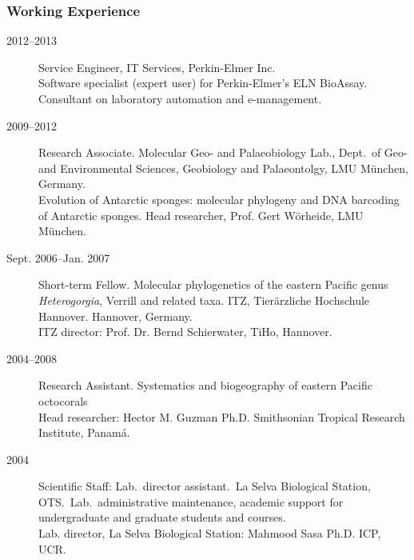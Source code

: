 \documentclass[letter,10pt]{article}
\begin{document}
\subsubsection*{Working Experience}
\begin{description}
\item [2012--2013] Service Engineer, IT Services, Perkin-Elmer Inc.\\Software specialist (expert user) for Perkin-Elmer's ELN BioAssay. Consultant on laboratory automation and e-management.

\item[2009--2012] Research Associate. Molecular Geo- and Palaeobiology Lab., Dept.~of Geo- and Environmental Sciences, Geobiology and Palaeontolgy, LMU M\"unchen, Germany.\\ Evolution of Antarctic sponges: molecular phylogeny and DNA barcoding of Antarctic sponges.
Head researcher, Prof. Gert W\"orheide, LMU M\"unchen.

\item[Sept. 2006--Jan. 2007] Short-term Fellow. Molecular phylogenetics of the eastern Pacific genus \emph{Heterogorgia}, Verrill and related taxa. ITZ, Tier\"arzliche Hochschule Hannover. Hannover, Germany.\\
ITZ director: Prof. Dr. Bernd Schierwater, TiHo, Hannover.

\item[2004--2008] Research Assistant. Systematics and biogeography of eastern Pacific octocorals\\
Head researcher: Hector M. Guzman Ph.D. Smithsonian Tropical Research Institute, Panam\'a.

\item[2004] Scientific Staff: Lab.~director assistant.~La Selva Biological Station, OTS.~Lab.~administrative maintenance, academic support for undergraduate and graduate students and courses.\\
Lab. director, La Selva Biological Station: Mahmood Sasa Ph.D. ICP, UCR.



\end{description}
\end{document}
